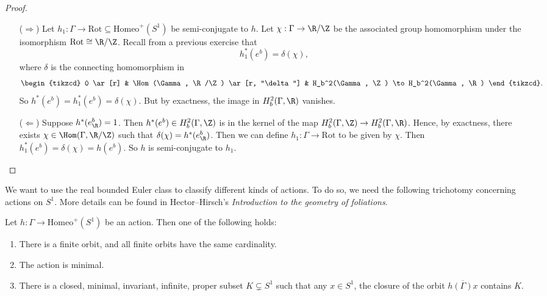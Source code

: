 \documentclass[a4paper]{article}
\newcommand\Homeo{\mathrm{Homeo}}
\newcommand\Rot{\mathrm{Rot}}
\begin{document}
\begin{proof}\leavevmode
  \begin{itemize}
    \item[($\Rightarrow$)] Let $h_1: \Gamma \to \Rot \subseteq \Homeo^+(S^1)$ be semi-conjugate to $h$. Let $\chi: \Gamma \to \R/\Z$ be the associated group homomorphism under the isomorphism $\Rot \cong \R/\Z$. Recall from a previous exercise that
      \[
        h_1^*(e^b) = \delta(\chi),
      \]
      where $\delta$ is the connecting homomorphism in
      \[
        \begin{tikzcd}
          0 \ar[r] & \Hom(\Gamma, \R/\Z) \ar[r, "\delta"] & H_b^2(\Gamma, \Z) \to H_b^2(\Gamma, \R)
        \end{tikzcd}.
      \]
      So $h^*(e^b) = h_1^*(e^b) = \delta(\chi)$. But by exactness, the image in $H_b^2(\Gamma, \R)$ vanishes.

    \item[($\Leftarrow$)] Suppose $h^*(e_\R^b) = 1$. Then $h^*(e^b) \in H_b^2(\Gamma, \Z)$ is in the kernel of the map $H^2_b(\Gamma, \Z) \to H^2_b(\Gamma, \R)$. Hence, by exactness, there exists $\chi \in \Hom(\Gamma, \R/\Z)$ such that $\delta(\chi) = h^*(e^b_\R)$. Then we can define $h_1: \Gamma \to \Rot$ to be given by $\chi$. Then $h_1^*(e^b) = \delta(\chi) = h(e^b)$. So $h$ is semi-conjugate to $h_1$.
  \end{itemize}
\end{proof}

We want to use the real bounded Euler class to classify different kinds of actions. To do so, we need the following trichotomy concerning actions on $S^1$. More details can be found in Hector--Hirsch's \emph{Introduction to the geometry of foliations}.

\begin{thm}
  Let $h: \Gamma \to \Homeo^+(S^1)$ be an action. Then one of the following holds:
  \begin{enumerate}
    \item There is a finite orbit, and all finite orbits have the same cardinality.
    \item The action is minimal.
    \item There is a closed, minimal, invariant, infinite, proper subset $K \subsetneq S^1$ such that any $x \in S^1$, the closure of the orbit $\overline{h(\Gamma) x}$ contains $K$.
  \end{enumerate}
\end{thm}
\end{document}
